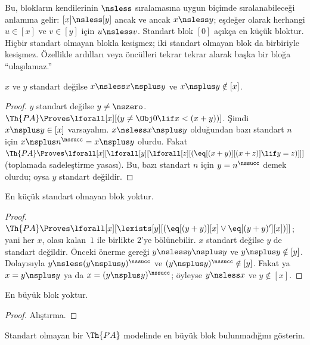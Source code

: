 \documentclass[../../../include/open-logic-section]{subfiles}
\begin{document}
\begin{explain}
Bu, blokların kendilerinin $\nsless$ sıralamasına uygun biçimde
sıralanabileceği anlamına gelir: $[x]\nsless[y]$ ancak ve ancak
$x\nsless y$; eşdeğer olarak herhangi $u\in[x]$ ve $v\in[y]$ için
$u\nsless v$. Standart blok $[0]$ açıkça en küçük bloktur. Hiçbir
standart olmayan blokla kesişmez; iki standart olmayan blok da
birbiriyle kesişmez. Özellikle ardılları veya öncülleri tekrar tekrar
alarak başka bir bloğa ``ulaşılamaz.''
\end{explain}

\begin{prop}
$x$ ve $y$ standart değilse $x\nsless x\nsplus y$ ve
$x\nsplus y\notin[x]$.
\end{prop}

\begin{proof}
$y$ standart değilse $y\neq\nszero$.
$\Th{PA}\Proves\lforall[x][(y\neq\Obj0\lif x<(x+y))]$. Şimdi
$x\nsplus y\in[x]$ varsayalım. $x\nsless x\nsplus y$ olduğundan bazı
standart $n$ için $x\nsplus n^\nssucc=x\nsplus y$ olurdu. Fakat
$\Th{PA}\Proves\lforall[x][\lforall[y][\lforall[z][
(\eq[(x+y)][(x+z)]\lif y=z)]]]$ (toplamada sadeleştirme yasası).
Bu, bazı standart $n$ için $y=n^\nssucc$ demek olurdu; oysa $y$
standart değildir.
\end{proof}

\begin{prop}
En küçük standart olmayan blok yoktur.
\end{prop}

\begin{proof}
$\Th{PA}\Proves\lforall[x][\lexists[y][(\eq[(y+y)][x]\lor
\eq[(y+y)'][x])]]$; yani her $x$, olası kalan~$1$ ile birlikte $2$'ye
bölünebilir. $x$ standart değilse $y$ de standart değildir. Önceki
önerme gereği $y\nsless y\nsplus y$ ve $y\nsplus y\notin[y]$.
Dolayısıyla $y\nsless(y\nsplus y)^\nssucc$ ve
$(y\nsplus y)^\nssucc\notin[y]$. Fakat ya $x=y\nsplus y$ ya da
$x=(y\nsplus y)^\nssucc$; öyleyse $y\nsless x$ ve $y\notin[x]$.
\end{proof}

\begin{prop}
En büyük blok yoktur.
\end{prop}

\begin{proof}
Alıştırma.
\end{proof}

\begin{prob}
Standart olmayan bir $\Th{PA}$ modelinde en büyük blok bulunmadığını
gösterin.
\end{prob}
\end{document}
